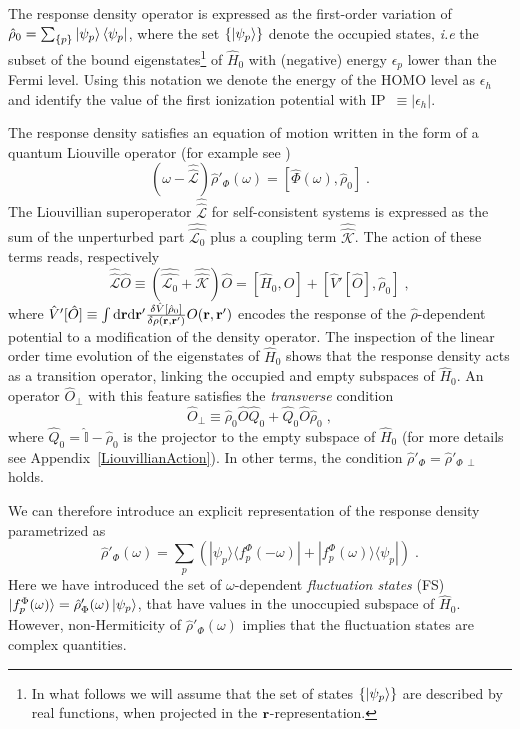 \documentclass[reprint,aps,prb]{revtex4-1}
\newcommand{\dd}{{\rm d}}
\renewcommand{\r}{{\bf r}}
\newcommand{\eps}{\epsilon}
\newcommand{\be}{\begin{equation}}
\newcommand{\ee}{\end{equation}}
\newcommand{\lb}{\label}
\newcommand{\op}[1]{\hat {#1}}
\newcommand{\sop}[1]{\op{\op {#1}}}
\newcommand{\commutator}[2]{\left[ {#1} , {#2} \right]}
\newcommand{\ketbra}[2]{| #1 \rangle \langle #2 |}
\newcommand{\dmnot}{\op{\rho}_0}
\newcommand{\dm}{\op{\rho}}
\newcommand{\hnot}{\op{H}_0}
\newcommand{\Liouv}{\sop{\mathcal L}}
\newcommand{\Liouvnot}{\sop{\mathcal L_0}}
\newcommand{\coupl}{\sop{\mathcal K}}
\newcommand{\identity}{\op{\mathbb I}}
\begin{document}
The response density operator is expressed as the first-order variation of $\dmnot=\sum_{\{p\}} \ket{\psi_p} \bra{\psi_p}$, where the set $\{\ket{\psi_p}\}$ denote the
occupied states, \emph{i.e} the subset of the bound eigenstates\footnote{In what follows we will assume that the set of states $\{\ket{\psi_p}\}$ are described by real
functions, when projected in the $\r$-representation.} of $\hnot$ with (negative) energy $\eps_p$ lower than the Fermi level. Using this notation we denote the energy of the HOMO level
as $\eps_h$ and identify the value of the first ionization potential with IP~$\equiv|\eps_h|$.

The response density satisfies an equation of motion written in the form of a quantum Liouville operator (for example see \cite{baroni2008})
\be\lb{LiouvillianRhopomegaDef1}
\left(\omega - \Liouv\right) \dm'_\Phi(\omega) =  \commutator{\op\Phi(\omega)}{\dmnot} \;.
\ee
The Liouvillian superoperator $\Liouv$ for self-consistent systems is expressed as the sum of the unperturbed part $\Liouvnot$ plus a coupling term $ \coupl$. The action of these
terms reads, respectively
\be\lb{LiouZeroDef1}
\Liouv \op O \equiv \left(\Liouvnot + \coupl \right) \op O = \commutator{\hnot}{\op O} +\commutator{\op V'[\op O]}{\dmnot}  \;,
\ee
where $\op V'[\op O] \equiv \int \dd \r \dd \r'\frac{\delta \op V[\dmnot]}{\delta \rho(\r,\r')} O(\r,\r')$ encodes the response of the $\dm$-dependent potential to a modification of the density operator.
The inspection of the linear order time evolution of the eigenstates of $\hnot$ shows that the response density acts as a transition
operator, linking the occupied and empty subspaces of $\hnot$.
An operator $\op O_\perp$ with this feature satisfies the \emph{transverse} condition
\be\lb{RhopTransverseDef1}
\op O_\perp \equiv
\dmnot\op O \op Q_0 + \op Q_0 \op O\dmnot \;,
\ee
where $\op Q_0=\identity-\dmnot$ is the projector to the empty subspace of $\hnot$
(for more details see Appendix~\ref{LiouvillianAction}).
In other terms, the condition $\dm'_\Phi = \dm'_{\Phi\,\perp}$ holds.

We can therefore introduce an explicit representation of the
response density parametrized as
\be\lb{rhoPrimeFluctuationStateDef1}
\dm'_\Phi(\omega) = \sum_p\left(\ketbra{\psi_p}{f_p^\Phi(-\omega)} + \ketbra{f_p^\Phi(\omega)}{\psi_p}\right) \;.
\ee
Here we have introduced the set of $\omega$-dependent \emph{fluctuation states} (FS)
$\ket{f_p^\Phi(\omega)} = \dm'_\Phi(\omega) \ket{\psi_p}$, that have values in the unoccupied subspace of $\hnot$.
However, non-Hermiticity of $\dm'_\Phi(\omega)$ implies that the
fluctuation states are complex quantities.
\end{document}
